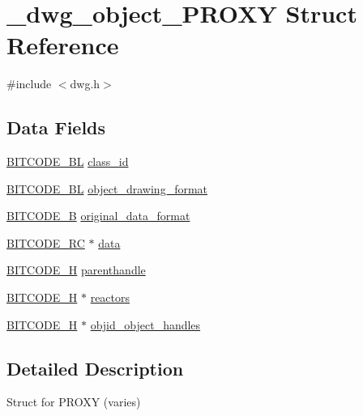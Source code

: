 \hypertarget{struct__dwg__object__PROXY}{\section{\-\_\-dwg\-\_\-object\-\_\-\-P\-R\-O\-X\-Y \-Struct \-Reference}
\label{struct__dwg__object__PROXY}
}


{\ttfamily \#include $<$dwg.\-h$>$}

\subsection*{\-Data \-Fields}
\begin{DoxyCompactItemize}
\item 
\hyperlink{dwg_8h_aebd5f127038868cbabc3d55d91da776c}{\-B\-I\-T\-C\-O\-D\-E\-\_\-\-B\-L} \hyperlink{struct__dwg__object__PROXY_a90234eece99b0a2f1e954a205579607e}{class\-\_\-id}
\item 
\hyperlink{dwg_8h_aebd5f127038868cbabc3d55d91da776c}{\-B\-I\-T\-C\-O\-D\-E\-\_\-\-B\-L} \hyperlink{struct__dwg__object__PROXY_a65dc81452cb3870cbf963837385d1232}{object\-\_\-drawing\-\_\-format}
\item 
\hyperlink{dwg_8h_ab533b1f62d9086749e3bb5b67e9f224e}{\-B\-I\-T\-C\-O\-D\-E\-\_\-\-B} \hyperlink{struct__dwg__object__PROXY_ae91fb0ed2ba451375be9e1fb4d69494c}{original\-\_\-data\-\_\-format}
\item 
\hyperlink{dwg_8h_a7fd199a8f9c9cc52bdab220f65a2a619}{\-B\-I\-T\-C\-O\-D\-E\-\_\-\-R\-C} $\ast$ \hyperlink{struct__dwg__object__PROXY_a5b40e7ed99a68b3c0914cfe1530be302}{data}
\item 
\hyperlink{dwg_8h_a7c700e94e047a97ba8c24bdfe4029dc3}{\-B\-I\-T\-C\-O\-D\-E\-\_\-\-H} \hyperlink{struct__dwg__object__PROXY_a7cd02442560e75721dcb8aa211eef48d}{parenthandle}
\item 
\hyperlink{dwg_8h_a7c700e94e047a97ba8c24bdfe4029dc3}{\-B\-I\-T\-C\-O\-D\-E\-\_\-\-H} $\ast$ \hyperlink{struct__dwg__object__PROXY_a5492567bd5c0c10175a849400a53ad97}{reactors}
\item 
\hyperlink{dwg_8h_a7c700e94e047a97ba8c24bdfe4029dc3}{\-B\-I\-T\-C\-O\-D\-E\-\_\-\-H} $\ast$ \hyperlink{struct__dwg__object__PROXY_acf2fa3b993558b1d43e3e23f7bdac784}{objid\-\_\-object\-\_\-handles}
\end{DoxyCompactItemize}


\subsection{\-Detailed \-Description}
\-Struct for \-P\-R\-O\-X\-Y (varies) 

